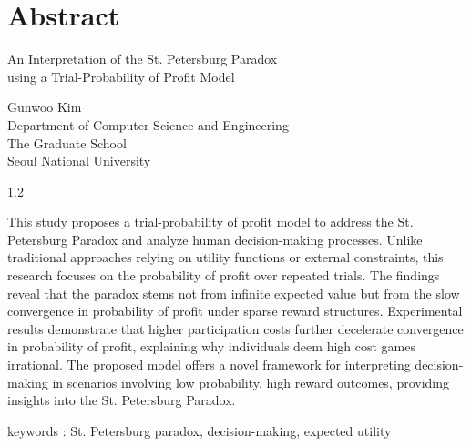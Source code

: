 \chapter*{Abstract}

\vspace{1em}

{\centering
  \fontsize{22pt}{22pt}\selectfont An Interpretation of the St. Petersburg Paradox \\ using a Trial-Probability of Profit Model
  \par}

\vspace{2em}

\begin{center}
  \begin{minipage}{0.8\textwidth}
    {\raggedleft
      \fontsize{14pt}{14pt}\selectfont
      Gunwoo Kim\\
      Department of Computer Science and Engineering\\
      The Graduate School\\
      Seoul National University
      \par}
  \end{minipage}
\end{center}

\vspace{1em}

\begin{spacing}{1.2}
  \begin{center}
    \begin{minipage}{0.8\textwidth}
      This study proposes a trial-probability of profit model to address the St. Petersburg Paradox and analyze human decision-making processes. Unlike traditional approaches relying on utility functions or external constraints, this research focuses on the probability of profit over repeated trials. The findings reveal that the paradox stems not from infinite expected value but from the slow convergence in probability of profit under sparse reward structures. Experimental results demonstrate that higher participation costs further decelerate convergence in probability of profit, explaining why individuals deem high cost games irrational. The proposed model offers a novel framework for interpreting decision-making in scenarios involving low probability, high reward outcomes, providing insights into the St. Petersburg Paradox.
    \end{minipage}
  \end{center}
\end{spacing}

\vspace{1em}

keywords : St. Petersburg paradox, decision-making, expected utility
